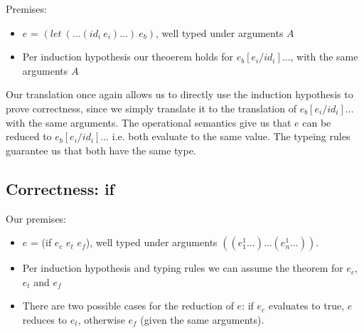 \documentclass[letterpaper,12pt]{article}
\begin{document}
Premises:
\begin{itemize}
	\item $e$ = $(let\: (\dots(id_i\: e_i)\dots)\: e_b)$, well typed
		under arguments $A$
	\item Per induction hypothesis our theoerem
		holds for $e_b[e_i / id_i]\dots$, with the same arguments $A$
\end{itemize}

Our translation once again allows us to directly use the induction
hypothesis to prove correctness, since we simply translate it to
the translation of $e_b[e_i / id_i]\dots$ with the same arguments.
The operational semantics give us that $e$ can be reduced to
$e_b[e_i / id_i]\dots$ i.e. both evaluate to the same value.
The typeing rules guarantee us that both have the same type.

% 

\subsection{Correctness: if}

Our premises:
\begin{itemize}
	\item $e$ = (if $e_c$ $e_t$ $e_f$), well typed under arguments
		$((e_1^1\dots)\dots(e_n^1\dots))$.
	\item Per induction hypothesis and typing rules we can assume the
		theorem for $e_c$, $e_t$ and $e_f$
	\item There are two possible cases for the reduction of $e$:
		if $e_c$ evaluates to true, $e$ reduces to $e_t$, otherwise 
		$e_f$ (given the same arguments).
\end{itemize}
\end{document}
